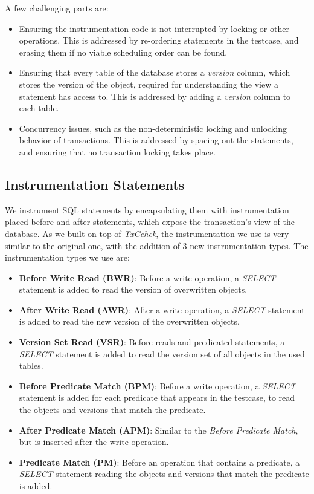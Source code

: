 A few challenging parts are:

\begin{itemize}
    \item Ensuring the instrumentation code is not interrupted by locking or other operations. This is addressed by re-ordering statements in the testcase, and erasing them if no viable scheduling order can be found.
    \item Ensuring that every table of the database stores a \textit{version} column, which stores the version of the object, required for understanding the view a statement has access to. This is addressed by adding a \textit{version} column to each table.
    \item Concurrency issues, such as the non-deterministic locking and unlocking behavior of transactions. This is addressed by spacing out the statements, and ensuring that no transaction locking takes place.
\end{itemize}


\subsection{Instrumentation Statements}

We instrument SQL statements by encapsulating them with instrumentation placed before and after statements, which expose the transaction's view of the database. As we built on top of \textit{TxCehck}, the instrumentation we use is very similar to the original one, with the addition of $3$ new instrumentation types. The instrumentation types we use are:

\begin{itemize}
    \item \textbf{Before Write Read (BWR)}: Before a write operation, a \textit{SELECT} statement is added to read the version of overwritten objects.
    \item \textbf{After Write Read (AWR)}: After a write operation, a \textit{SELECT} statement is added to read the new version of the overwritten objects.
    \item \textbf{Version Set Read (VSR)}: Before reads and predicated statements, a \textit{SELECT} statement is added to read the version set of all objects in the used tables.
    \item \textbf{Before Predicate Match (BPM)}: Before a write operation, a \textit{SELECT} statement is added for each predicate that appears in the testcase, to read the objects and versions that match the predicate.
    \item \textbf{After Predicate Match (APM)}: Similar to the \textit{Before Predicate Match}, but is inserted after the write operation.
    \item \textbf{Predicate Match (PM)}: Before an operation that contains a predicate, a \textit{SELECT} statement reading the objects and versions that match the predicate is added.
\end{itemize}

